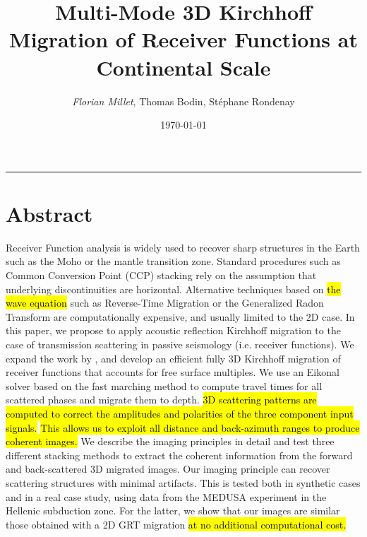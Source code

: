 \documentclass[10pt,a4paper]{article}
\title{Multi-Mode 3D Kirchhoff Migration of Receiver Functions at Continental Scale}
\author{\textit{Florian Millet}, Thomas Bodin, Stéphane Rondenay}
\date{\today}
\renewcommand{\thepage}{}
\begin{document}

\renewcommand{\thepage}{\arabic{page}}
\setcounter{page}{1}

\maketitle

\begin{center}\rule{4cm}{.55pt}\end{center}
\vspace{-2mm}

\section*{Abstract}

Receiver Function analysis is widely used to recover sharp structures in the Earth such as the Moho or the mantle transition zone. 
Standard procedures such as Common Conversion Point (CCP) stacking rely on the assumption that underlying discontinuities are horizontal. 
Alternative techniques based on \hl{the wave equation} such as Reverse-Time Migration or the Generalized Radon Transform are computationally expensive, and usually limited to the 2D case. 
In this paper, we propose to apply acoustic reflection Kirchhoff migration to the case of transmission scattering in passive seismology (i.e. receiver functions).
We expand the work by \citet{cheng_gji_16}, and develop an efficient fully 3D Kirchhoff migration of receiver functions that accounts for free surface multiples. 
We use an Eikonal solver based on the fast marching method to compute travel times for all scattered phases and migrate them to depth. 
\hl{3D scattering patterns are computed to correct the amplitudes and polarities of the three component input signals.}
\hl{This allows us to exploit all distance and back-azimuth ranges to produce coherent images.}
We describe the imaging principles in detail and test three different stacking methods to extract the coherent information from the forward and back-scattered 3D migrated images. 
Our imaging principle can recover scattering structures with minimal artifacts. 
This is tested both in synthetic cases and in a real case study, using data from the MEDUSA experiment in the Hellenic subduction zone. 
For the latter, we show that our images are similar those obtained with a 2D GRT migration \hl{at no additional computational cost.}
\end{document}
